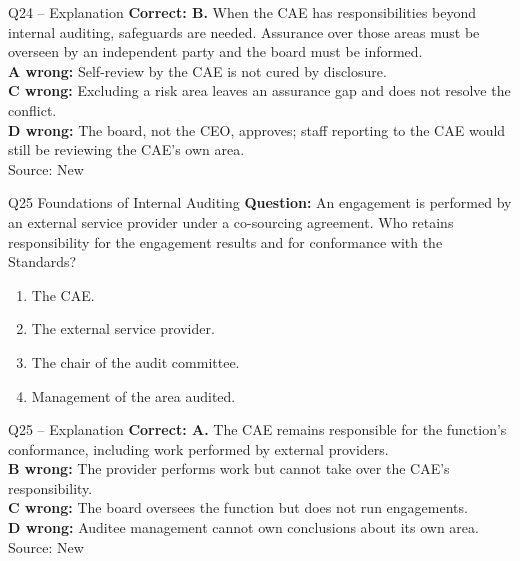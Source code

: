 \documentclass[aspectratio=169,10pt]{beamer}
\begin{document}
\begin{frame}[t]{Q24 -- Explanation}
	\footnotesize
	\textbf{Correct: B.} When the CAE has responsibilities beyond internal auditing, safeguards are needed. Assurance over those areas must be overseen by an independent party and the board must be informed. \\[5pt]
\textbf{A wrong:} Self-review by the CAE is not cured by disclosure. \\[3pt]
\textbf{C wrong:} Excluding a risk area leaves an assurance gap and does not resolve the conflict. \\[3pt]
\textbf{D wrong:} The board, not the CEO, approves; staff reporting to the CAE would still be reviewing the CAE's own area. \\[3pt]
	\vfill {\tiny Source: New}
\end{frame}

\begin{frame}[t]{Q25 \hfill {\scriptsize Foundations of Internal Auditing}}
	\small
	\textbf{Question:} An engagement is performed by an external service provider under a co-sourcing agreement. Who retains responsibility for the engagement results and for conformance with the Standards?
	\begin{enumerate}[label=\Alph*.,itemsep=1pt,topsep=3pt]
			\item The CAE.
			\item The external service provider.
			\item The chair of the audit committee.
			\item Management of the area audited.
	\end{enumerate}
\end{frame}

\begin{frame}[t]{Q25 -- Explanation}
	\footnotesize
	\textbf{Correct: A.} The CAE remains responsible for the function's conformance, including work performed by external providers. \\[5pt]
\textbf{B wrong:} The provider performs work but cannot take over the CAE's responsibility. \\[3pt]
\textbf{C wrong:} The board oversees the function but does not run engagements. \\[3pt]
\textbf{D wrong:} Auditee management cannot own conclusions about its own area. \\[3pt]
	\vfill {\tiny Source: New}
\end{frame}
\end{document}
